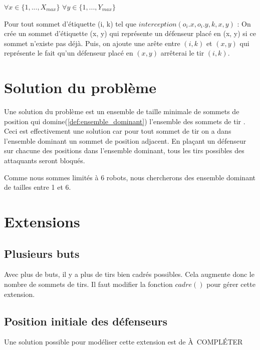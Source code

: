 $\forall x \in \{1, ..., X_{max}\}$ $\forall y \in \{1, ..., Y_{max}\}$ 

Pour tout sommet d'étiquette (i, k) tel que $interception(o_i.x, o_i.y, k, x, y)$ : On crée un sommet d'étiquette (x, y) qui représente un défenseur placé en (x, y) si ce sommet n'existe pas déjà. Puis, on ajoute une arête entre $(i, k)$ et $(x, y)$ qui représente le fait qu'un défenseur placé en $(x, y)$ arrêterai le tir $(i, k)$.

\section{Solution du problème}
Une solution du problème est un ensemble de taille minimale de sommets de position qui domine(\ref{def:ensemble_dominant}) l'ensemble des sommets de tir . Ceci est effectivement une solution car pour tout sommet de tir on a dans l'ensemble dominant un sommet de position adjacent. En plaçant un défenseur sur chacune des positions dans l'ensemble dominant, tous les tirs possibles des attaquants seront bloqués.

Comme nous sommes limités à 6 robots, nous chercherons des ensemble dominant de tailles entre 1 et 6.

\section{Extensions}
\subsection{Plusieurs buts}
Avec plus de buts, il y a plus de tirs bien cadrés possibles. Cela augmente donc le nombre de sommets de tirs. Il faut modifier la fonction $cadre()$ pour gérer cette extension.

\subsection{Position initiale des défenseurs}
Une solution possible pour modéliser cette extension est de À COMPLÉTER
